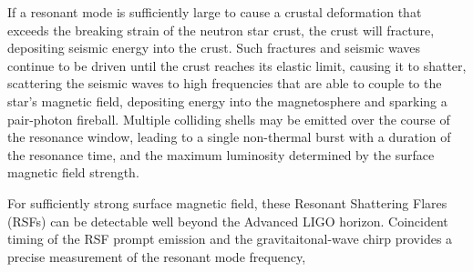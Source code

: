 \documentclass[fleqn,usenatbib]{mnras}
\begin{document}
If a resonant mode is sufficiently large to cause a crustal deformation that exceeds the breaking strain of the neutron star crust, %
the crust will fracture, depositing seismic energy into the crust. Such fractures and seismic waves continue to be driven until the crust reaches its elastic limit, causing it to shatter, scattering the seismic waves to high frequencies that are able to couple to the star's magnetic field, depositing energy into the magnetosphere and sparking a pair-photon fireball. Multiple colliding shells may be emitted over the course of the resonance window, leading to a single non-thermal burst with a duration of the resonance time, and the maximum luminosity determined by the surface magnetic field strength.%


For sufficiently strong surface magnetic field, these Resonant Shattering Flares (RSFs) can be detectable well beyond the Advanced LIGO horizon. Coincident timing of the RSF prompt emission and the gravitaitonal-wave chirp provides a precise measurement of the resonant mode frequency,  





\end{document}
